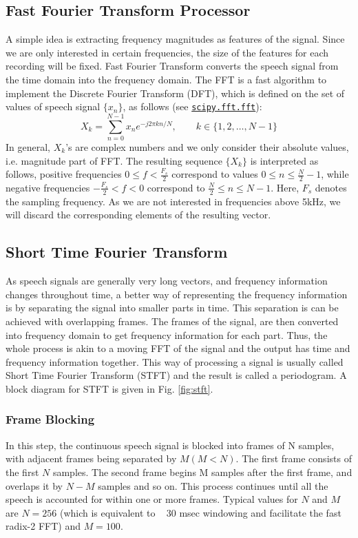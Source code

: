 \documentclass{article}
\begin{document}
\subsection{Fast Fourier Transform Processor}
A simple idea is extracting frequency magnitudes as features of the signal. Since we are only interested in certain frequencies, the size of the features for each recording will be fixed. Fast Fourier Transform converts the speech signal from the time domain into the frequency domain.  The FFT is a fast algorithm to implement the Discrete Fourier Transform (DFT), which is defined on the set of values of speech signal $\{x_n\}$, as follows (see \href{https://docs.scipy.org/doc/scipy/reference/generated/scipy.fft.fft.html#scipy.fft.fft}{\texttt{scipy.fft.fft}}):
\begin{equation}
    X_k = \sum_{n=0}^{N-1} x_n e^{-j2\pi k n/N}, \qquad k\in\{1,2,\dots, N-1\}
\end{equation}
In general, $X_k$'s are complex numbers and we only consider their absolute values, i.e. magnitude part of FFT. The resulting sequence $\{X_k\}$ is interpreted as follows, positive frequencies $0\leq f < \frac{F_s}{2}$ correspond to values $0\leq n \leq \frac{N}{2}-1$, while negative frequencies $-\frac{F_s}{2}< f < 0$ correspond to $\frac{N}{2} \leq n \leq N-1$.  Here, $F_s$ denotes the sampling frequency. As we are not interested in frequencies above 5kHz, we will discard the corresponding elements of the resulting vector.

\subsection{Short Time Fourier Transform}
As speech signals are generally very long vectors, and frequency information changes throughout time, a better way of representing the frequency information is by separating the signal into smaller parts in time. This separation is can be achieved with overlapping frames. The frames of the signal, are then converted into frequency domain to get frequency information for each part. Thus, the whole process is akin to a moving FFT of the signal and the output has time and frequency information together. This way of processing a signal is usually called Short Time Fourier Transform (STFT) and the result is called a periodogram. A block diagram for STFT is given in Fig. \ref{fig:stft}.

\subsubsection{Frame Blocking}
In this step, the continuous speech signal is blocked into frames of N  samples, with adjacent frames being separated by $M (M < N)$.  The first frame consists of the first $N$ samples.  The second frame begins M samples after the first frame, and overlaps it by $N - M$ samples and so on.  This process continues until all the speech is accounted for within one or more frames.  Typical values for $N$ and $M$ are $N = 256$ (which is equivalent to ~ 30 msec windowing and facilitate the fast radix-2 FFT) and $M = 100$.
\end{document}
